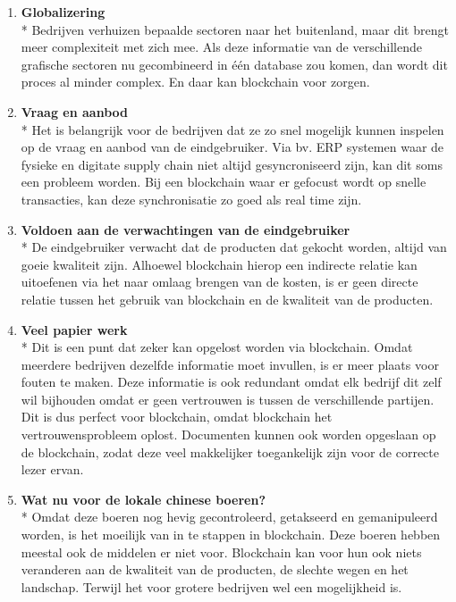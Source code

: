 \documentclass[fleqn,a4paper,12pt]{book}
\begin{document}
\begin{enumerate}
	\item \textbf{Globalizering}\\*
		Bedrijven verhuizen bepaalde sectoren naar het buitenland, maar dit brengt meer complexiteit met zich mee. Als deze informatie van de verschillende grafische sectoren nu gecombineerd in één database zou komen, dan wordt dit proces al minder complex. En daar kan blockchain voor zorgen.
	\item \textbf{Vraag en aanbod}\\*
		Het is belangrijk voor de bedrijven dat ze zo snel mogelijk kunnen inspelen op de vraag en aanbod van de eindgebruiker. Via bv. ERP systemen waar de fysieke en digitate supply chain niet altijd gesyncroniseerd zijn, kan dit soms een probleem worden. Bij een blockchain waar er gefocust wordt op snelle transacties, kan deze synchronisatie zo goed als real time zijn.
	\item \textbf{Voldoen aan de verwachtingen van de eindgebruiker}\\*
		De eindgebruiker verwacht dat de producten dat gekocht worden, altijd van goeie kwaliteit zijn. Alhoewel blockchain hierop een indirecte relatie kan uitoefenen via het naar omlaag brengen van de kosten, is er geen directe relatie tussen het gebruik van blockchain en de kwaliteit van de producten.
	\item \textbf{Veel papier werk}\\*
		Dit is een punt dat zeker kan opgelost worden via blockchain. Omdat meerdere bedrijven dezelfde informatie moet invullen, is er meer plaats voor fouten te maken. Deze informatie is ook redundant omdat elk bedrijf dit zelf wil bijhouden omdat er geen vertrouwen is tussen de verschillende partijen. Dit is dus perfect voor blockchain, omdat blockchain het vertrouwensprobleem oplost. Documenten kunnen ook worden opgeslaan op de blockchain, zodat deze veel makkelijker toegankelijk zijn voor de correcte lezer ervan.
	\item \textbf{Wat nu voor de lokale chinese boeren?}\\*
		Omdat deze boeren nog hevig gecontroleerd, getakseerd en gemanipuleerd worden, is het moeilijk van in te stappen in blockchain. Deze boeren hebben meestal ook de middelen er niet voor. Blockchain kan voor hun ook niets veranderen aan de kwaliteit van de producten, de slechte wegen en het landschap. Terwijl het voor grotere bedrijven wel een mogelijkheid is.
\end{enumerate}
\end{document}
